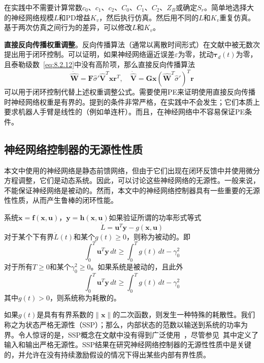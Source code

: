 \documentclass[12pt,a4paper]{ctexart}
\begin{document}
在实践中不需要计算常数$c_0$、$c_1$、$c_2$、$C_0$、$C_1$、$C_2$、$Z_B$或确定$S_r$。简单地选择大的神经网络规模$L$和PD增益$K_v$，然后执行仿真。然后用不同的$L$和$K_v$重复仿真。基于两次仿真之间行为的差异，可以修改$L$和$K_v$。

\textbf{直接反向传播权重调整}。反向传播算法（通常以离散时间形式）在文献中被无数次提出用于闭环控制。可以证明，如果神经网络逼近误差$\varepsilon$为零，扰动$\bm{\tau}_d(t)$为零，且泰勒级数~\eqref{eq:8.2.12}中没有高阶项，那么直接反向传播算法
\begin{equation}\label{eq:8.5.7}
\dot{\hat{\bm{W}}} = \bm{F}\hat{\sigma}'\hat{\bm{V}}^T\bm{x}\bm{r}^T, \quad \dot{\hat{\bm{V}}} = \bm{G}\bm{x}(\hat{\bm{W}}^T\hat{\sigma}')^T\bm{r}
\end{equation}
可以用于闭环控制代替上述权重调整公式。需要使用PE来证明使用直接反向传播时神经网络权重是有界的。提到的条件非常严格，在实践中不会发生；它们本质上要求机器人手臂是线性的（例如单连杆）。而且，在神经网络中不容易保证PE条件。

\subsection{神经网络控制器的无源性性质}

本文中使用的神经网络是静态前馈网络，但由于它们出现在闭环反馈中并使用微分方程调整，它们是动态系统。因此，可以讨论这些神经网络的无源性。一般来说，不能保证神经网络是被动的。然而，本文中的神经网络控制器具有一些重要的无源性性质，从而产生鲁棒的闭环性能。

系统$\dot{\bm{x}}=\bm{f}(\bm{x},\bm{u})$，$\bm{y}=\bm{h}(\bm{x},\bm{u})$如果验证所谓的功率形式等式~\cite{slotine1991}
\begin{equation}
\dot{L} = \bm{u}^T\bm{y} - g(\bm{x},\bm{u})
\end{equation}
对于某个下有界$\dot{L}(t)$和某个$g(t) \geq 0$，则称为被动的。即
\begin{equation}
\int_0^T \bm{u}^T\bm{y} \, dt \geq \int_0^T g(t) \, dt - \gamma_0^2
\end{equation}
对于所有$T \geq 0$和某个$\gamma_0^2 \geq 0$。如果系统是被动的，且此外
\begin{equation}\label{eq:8.5.10}
\int_0^T \bm{u}^T\bm{y} \, dt \geq \int_0^T g(t) \, dt - \gamma_0^2
\end{equation}
其中$g(t) > 0$，则系统称为耗散的。

如果$g(t)$是具有有界系数的$\|\bm{x}\|$的二次函数，则发生一种特殊的耗散性。我们称之为状态严格无源性（SSP）；那么，内部状态的范数以输送到系统的功率为界。令人惊讶的是，SSP概念在文献中没有得到广泛使用~\cite{lewis1993,seron1994}，尽管参见~\cite{goodwin1984}其中定义了输入和输出严格无源性。SSP结果在研究神经网络控制器的无源性性质中是关键的，并允许在没有持续激励假设的情况下得出某些内部有界性质。
\end{document}
